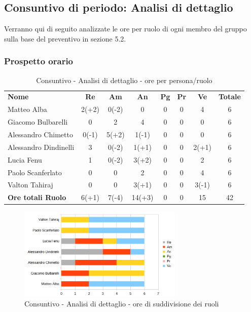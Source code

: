 	

	
\newpage	
	
\subsection{Consuntivo di periodo: Analisi di dettaglio}
Verranno qui di seguito analizzate le ore per ruolo di ogni membro del gruppo sulla base del preventivo in sezione 5.2.

\subsubsection{Prospetto orario}
	\begin{table} [h!]
	\begin{center}
		\begin{tabular} { m{3.5cm} c c c c c c c }
			\rowcolor{lightgray}
			\textbf{Nome} & \textbf{Re} & \textbf{Am} & \textbf{An} & \textbf{Pg} & \textbf{Pr} & \textbf{Ve} & \textbf{Totale} \\
			Matteo Alba               & 2(+2) & 0(-2) & 0      & 0  & 0  & 4      & 6 \\
			Giacomo Bulbarelli        & 0     & 2     & 4      & 0  & 0  & 0      & 6 \\
			Alessandro Chimetto       & 0(-1) & 5(+2) & 1(-1)  & 0  & 0  & 0      & 6 \\
			Alessandro Dindinelli     & 3     & 0(-2) & 1(+1)  & 0  & 0  & 2(+1)  & 6 \\
			Lucia Fenu                & 1     & 0(-2) & 3(+2)  & 0  & 0  & 2      & 6 \\
			Paolo Scanferlato         & 0     & 0     & 2      & 0  & 0  & 4      & 6 \\
			Valton Tahiraj            & 0     & 0     & 3(+1)  & 0  & 0  & 3(-1)  & 6\\
			\textbf{Ore totali Ruolo} & 6(+1) & 7(-4) & 14(+3) & 0  & 0  & 15     & 42
		\end{tabular}
		\caption{Consuntivo - Analisi di dettaglio - ore per persona/ruolo}
	\end{center}
\end{table}

	\begin{figure} [h!]
	\centering
	\includegraphics[width=0.7\textwidth]{res/img/grafici/consuntivo-barre- ore analisi dettaglio.png}
	\caption{Consuntivo - Analisi di dettaglio - ore di suddivisione dei ruoli} 
\end{figure}

